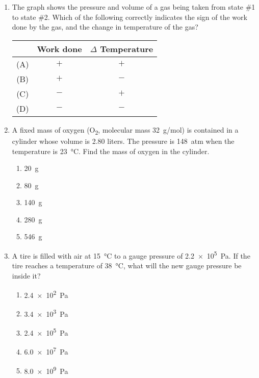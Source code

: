 \documentclass{../../oss-apphys}
\begin{document}
\begin{multicols}{2}
\begin{enumerate}[leftmargin=18pt,start=24]
  \item The graph shows the pressure and volume of a gas being taken from state
    \#1 to state \#2. Which of the following correctly indicates the sign of
    the work done by the gas, and the change in temperature of the gas?
    \begin{center}
      \vspace{-.15in}

      \begin{tabular}{ccc}
        & \textbf{Work done} & $\Delta$ \textbf{Temperature}\\ \hline
        (A) & $+$ & $+$ \\
        (B) & $+$ & $-$ \\
        (C) & $-$ & $+$ \\
        (D) & $-$ & $-$
      \end{tabular}
    \end{center}

    \columnbreak
    
  \item A fixed mass of oxygen (O\textsubscript{2}, molecular mass
    \SI{32}{g/mol}) is contained in a cylinder whose volume is \num{2.80}
    liters. The pressure is \SI{148}{atm} when the temperature is
    \SI{23}{\celsius}. Find the mass of oxygen in the cylinder.
    \begin{enumerate}[noitemsep,topsep=0pt,leftmargin=18pt,label=(\Alph*)]
    \item\SI{20}{\gram}
    \item\SI{80}{\gram}
    \item\SI{140}{\gram}
    \item\SI{280}{\gram}
    \item\SI{546}{\gram}
    \end{enumerate}

  \item A tire is filled with air at \SI{15}{\celsius} to a gauge pressure of
    \SI{2.2e5}{\pascal}. If the tire reaches a temperature of \SI{38}{\celsius},
    what will the new gauge pressure be inside it?
    \begin{enumerate}[noitemsep,topsep=0pt,leftmargin=18pt,label=(\Alph*)]
    \item\SI{2.4e2}{\pascal}
    \item\SI{3.4e3}{\pascal}
    \item\SI{2.4e5}{\pascal}
    \item\SI{6.0e7}{\pascal}
    \item\SI{8.0e9}{\pascal}
    \end{enumerate}


\end{enumerate}
\end{multicols}
\end{document}
